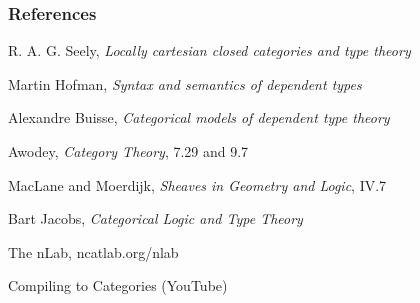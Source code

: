 \documentclass[
xcolor={usenames,dvipsnames,svgnames},
]{beamer}
\begin{document}
  \begin{frame}
    \frametitle{References}
    R. A. G. Seely, \textit{Locally cartesian closed categories and type theory}

    Martin Hofman, \textit{Syntax and semantics of dependent types}

    Alexandre Buisse, \textit{Categorical models of dependent type theory}

    Awodey, \textit{Category Theory}, 7.29 and 9.7

    MacLane and Moerdijk, \textit{Sheaves in Geometry and Logic}, IV.7

    Bart Jacobs, \textit{Categorical Logic and Type Theory}

    The nLab, ncatlab.org/nlab

    Compiling to Categories (YouTube)

  \end{frame}

%
\end{document}

